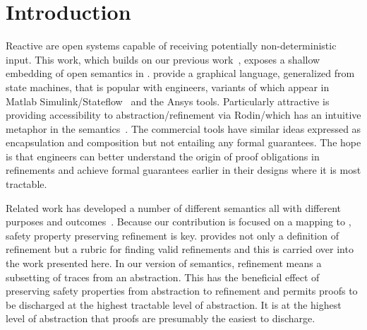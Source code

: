 

\section{Introduction}

Reactive \SCs are open systems capable of receiving potentially non-deterministic input.  
This work, which builds on our previous work~\cite{MoSn16,MoSnHo18}, exposes a shallow embedding of open \SCs semantics in \EventB. 
\SCs provide a graphical language, generalized from state machines, that is popular with engineers, variants of which appear in Matlab
Simulink/Stateflow~\cite{MATLAB:2019} and the Ansys tools.
Particularly attractive is providing accessibility to
abstraction/refinement via Rodin/\EventB which has an intuitive
metaphor in the \SC semantics~\cite{MoSn16,MoSnHo18}.  The commercial
tools have similar ideas expressed as encapsulation and composition
but not entailing any formal guarantees.  The hope is that engineers
can better understand the origin of proof obligations in refinements
and achieve formal guarantees earlier in their designs where it is
most tractable.

Related work has developed a number of different semantics all with
different purposes and outcomes~\cite{Syriani_2019,Harel,Maraninchi91theargos}.  
Because our contribution is focused on a mapping to \EventB, safety property preserving
refinement is key.  \EventB provides not only a definition of
refinement but a rubric for finding valid refinements and this is
carried over into the \SCs work presented here.  
In our version of \SC
semantics, refinement means a subsetting of traces from an
abstraction.  
This has the beneficial effect of preserving safety
properties from abstraction to refinement and permits proofs to be
discharged at the highest tractable level of abstraction.  
It is at
the highest level of abstraction that proofs are presumably the
easiest to discharge.


